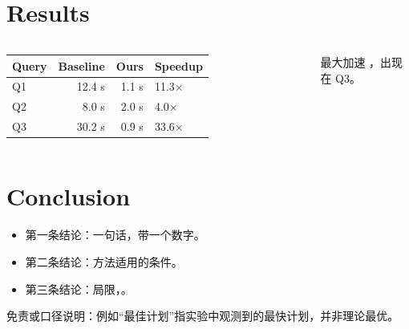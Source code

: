 \documentclass[aspectratio=169,10pt,t]{beamer}
\begin{document}
\section{Results}
\begin{frame}
  \begin{columns}[T,onlytextwidth]
      {\densesize\warmrule
      \begin{tabular}{@{}lrrH@{}}
        \toprule
        \textbf{Query} & \textbf{Baseline} & \textbf{Ours} & \textbf{Speedup}\\
        \midrule
        Q1 & 12.4 s & 1.1 s & 11.3$\times$\\
        Q2 & 8.0 s & 2.0 s & 4.0$\times$\\
        Q3 & 30.2 s & 0.9 s & 33.6$\times$\\
        \bottomrule
      \end{tabular}\par}
      \vspace{6pt}
      \begin{takeaway}
        最大加速 ，出现在 Q3。
      \end{takeaway}
  \end{columns}
\end{frame}

\section{Conclusion}
\begin{frame}
  \begin{itemize}\setlength{\itemsep}{6pt}
    \item 第一条结论：一句话，带一个数字。
    \item 第二条结论：方法适用的条件。
    \item 第三条结论：局限，。
  \end{itemize}
  \vfill
  \begin{fignote}
    免责或口径说明：例如“最佳计划”指实验中观测到的最快计划，并非理论最优。
  \end{fignote}
\end{frame}
\end{document}
